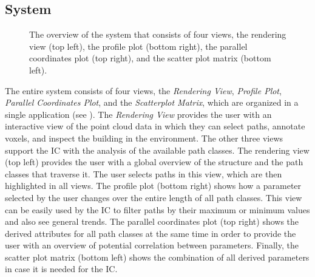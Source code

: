 \subsection{System} \label{contributions:usar:system}
\begin{figure}
\centering
{}
\caption{The overview of the system that consists of four views, the rendering view (top left), the profile plot (bottom right), the parallel coordinates plot (top right), and the scatter plot matrix (bottom left).}
\label{contributions:usar:system:system}
\end{figure}

The entire system consists of four views, the \emph{Rendering View}, \emph{Profile Plot}, \emph{Parallel Coordinates Plot}, and the \emph{Scatterplot Matrix}, which are organized in a single application (see ).  The \emph{Rendering View} provides the user with an interactive view of the point cloud data in which they can select paths, annotate voxels, and inspect the building in the  environment.  The other three views support the IC with the analysis of the available path classes.  The rendering view (top left) provides the user with a global overview of the structure and the path classes that traverse it.  The user selects paths in this view, which are then highlighted in all views.  The profile plot (bottom right) shows how a parameter selected by the user changes over the entire length of all path classes.  This view can be easily used by the IC to filter paths by their maximum or minimum values and also see general trends.  The parallel coordinates plot (top right) shows the derived attributes for all path classes at the same time in order to provide the user with an overview of potential correlation between parameters.  Finally, the scatter plot matrix (bottom left) shows the combination of all derived parameters in case it is needed for the IC.


